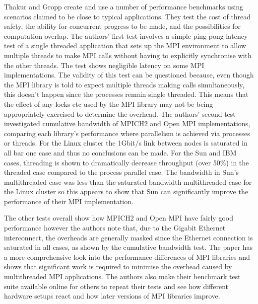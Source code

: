 Thakur and Gropp \cite{Thakur2009} create and use a number of performance
benchmarks using scenarios claimed to be close to typical applications. They
test the cost of thread safety, the ability for concurrent progress to be made,
and the possibilities for computation overlap. The authors' first test involves
a simple ping-pong latency test of a single threaded application that sets up
the MPI environment to allow multiple threads to make MPI calls without having
to explicitly synchronise with the other threads. The test shows negligible
latency on some MPI implementations. The validity of this test can be questioned
because, even though the MPI library is told to expect multiple threads making
calls simultaneously, this doesn't happen since the processes remain single
threaded. This means that the effect of any locks etc used by the MPI library
may not be being appropriately exercised to determine the overhead. The authors'
second test investigated cumulative bandwidth of MPICH2 and Open MPI
implementations, comparing each library's performance where parallelism is
achieved via processes or threads. For the Linux cluster the 1Gbit/s link
between nodes is saturated in all bar one case and thus no conclusions can be
made. For the Sun and IBM cases, threading is shown to dramatically decrease
throughput (over 50\%) in the threaded case compared to the process parallel
case. The bandwidth in Sun's multithreaded case was less than the saturated
bandwidth multithreaded case for the Linux cluster so this appears to show that
Sun can significantly improve the performance of their MPI implementation.

The other tests overall show how MPICH2 and Open MPI have fairly good
performance however the authors note that, due to the Gigabit Ethernet
interconnect, the overheads are generally masked since the Ethernet connection
is saturated in all cases, as shown by the cumulative bandwidth test. The paper
has a more comprehensive look into the performance differences of MPI libraries
and shows that significant work is required to minimise the overhead caused by
multithreaded MPI applications. The authors also make their benchmark test suite
available online for others to repeat their tests and see how different hardware
setups react and how later versions of MPI libraries improve.
